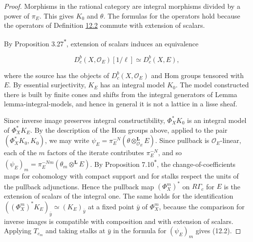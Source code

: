 \documentclass[11pt]{article}
\newcommand{\bpout}[1]{#1\textsuperscript{\hyperlink{bp-outside}{\ensuremath{\ast}}}}
\providecommand{\Dbc}{}\renewcommand{\Dbc}{D^b_c}
\begin{document}
\begin{proof}[{Proof}]\label{bp295}%
Morphisms in the rational category are integral morphisms divided by a power of \(\pi_E\). This gives \(K_0\) and \(\theta\). The formulas for the operators hold because the operators of Definition \hyperref[bp232]{12.2} commute with extension of scalars.

By Proposition \bpout{3.27}, extension of scalars induces an equivalence

\[
\Dbc(X,\mathcal O_E)[1/\ell]\simeq\Dbc(X,E),
\]

where the source has the objects of \(\Dbc(X,\mathcal O_E)\) and Hom groups tensored with \(E\). By essential surjectivity, \(K_E\) has an integral model \(K_0\). The model constructed there is built by finite cones and shifts from the integral generators of Lemma lemma-integral-models, and hence in general it is not a lattice in a lisse sheaf.

Since inverse image preserves integral constructibility, \(\Phi_X^*K_0\) is an integral model of \(\Phi_X^*K_E\). By the description of the Hom groups above, applied to the pair \((\Phi_X^*K_0,K_0)\), we may write \(\psi_E=\pi_E^{-N}(\theta\otimes^{\mathbf L}_{\mathcal O_E}E)\). Since pullback is \(\mathcal O_E\)-linear, each of the \(m\) factors of the iterate contributes \(\pi_E^{-N}\), and so \((\psi_E)_m=\pi_E^{-Nm}(\theta_m\otimes^{\mathbf L} E)\). By Proposition \bpout{7.10}, the change-of-coefficients maps for cohomology with compact support and for stalks respect the units of the pullback adjunctions. Hence the pullback map \((\Phi_X^m)^*\) on \(R\Gamma_c\) for \(E\) is the extension of scalars of the integral one. The same holds for the identification \(((\Phi_X^m)^*K_E)_{\bar y}\simeq (K_E)_{\bar y}\) at a fixed point \(\bar y\) of \(\Phi_X^m\), because the comparison for inverse images is compatible with composition and with extension of scalars. Applying \(T_{c_m}\) and taking stalks at \(\bar y\) in the formula for \((\psi_E)_m\) gives (12.2).
\end{proof}
\end{document}
